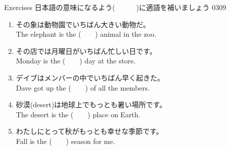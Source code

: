 \documentclass[aspectratio=169,xcolor={dvipsnames,table}]{beamer}
\begin{document}
\begin{frame}[plain]{Exercises}
日本語の意味になるよう(~~~~~~)に適語を補いましょう%
\hfill{\tiny 0309}\,{\scriptsize {}}
 \begin{enumerate}
  \item その象は動物園でいちばん大きい動物だ。\\
	The elephant is the (~~~~) animal in the zoo. \visible<2->{または\textcolor{Maroon}{biggest}}
  \item その店では月曜日がいちばん忙しい日です。\\
	Monday is the (~~~~) day at the store.
  \item デイブはメンバーの中でいちばん早く起きた。\\
	Dave got up the (~~~~) of all the members.
  \item 砂漠(desert)は地球上でもっとも暑い場所です。\\
	The desert is the (~~~~) place on Earth.
  \item わたしにとって秋がもっとも幸せな季節です。\\
	Fall  is the (~~~~) season for me.
 \end{enumerate}
\end{frame}
\end{document}
